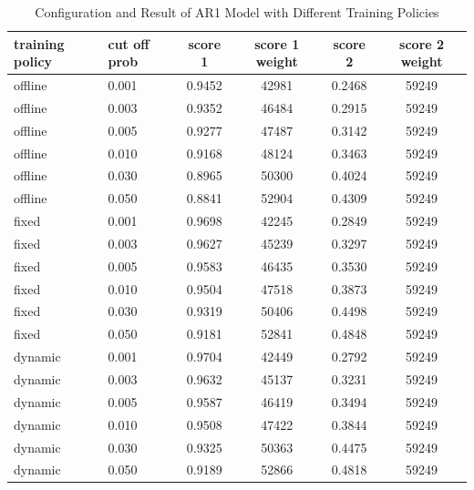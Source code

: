 \documentclass{article}
\begin{document}
\begin{table}[htbp]
  \begin{center}
    \caption{Configuration and Result of AR1 Model with Different Training Policies}
    \label{tab:tab1.5.1}
    \begin{tabular}{l|l|*{4}{c}} \textbf{training policy} & \textbf{cut off
      prob} & \textbf{score 1} & \textbf{score 1 weight} & \textbf{score 2} &
      \textbf{score 2 weight} \\
      \hline
      offline & 0.001 & 0.9452 & 42981 & 0.2468 & 59249\\
      offline & 0.003 & 0.9352 & 46484 & 0.2915 & 59249\\
      offline & 0.005 & 0.9277 & 47487 & 0.3142 & 59249\\
      offline & 0.010 & 0.9168 & 48124 & 0.3463 & 59249\\
      offline & 0.030 & 0.8965 & 50300 & 0.4024 & 59249\\
      offline & 0.050 & 0.8841 & 52904 & 0.4309 & 59249\\
      fixed & 0.001 & 0.9698 & 42245 & 0.2849 & 59249\\
      fixed & 0.003 & 0.9627 & 45239 & 0.3297 & 59249\\
      fixed & 0.005 & 0.9583 & 46435 & 0.3530 & 59249\\
      fixed & 0.010 & 0.9504 & 47518 & 0.3873 & 59249\\
      fixed & 0.030 & 0.9319 & 50406 & 0.4498 & 59249\\
      fixed & 0.050 & 0.9181 & 52841 & 0.4848 & 59249\\
      dynamic & 0.001 & 0.9704 & 42449 & 0.2792 & 59249\\
      dynamic & 0.003 & 0.9632 & 45137 & 0.3231 & 59249\\
      dynamic & 0.005 & 0.9587 & 46419 & 0.3494 & 59249\\
      dynamic & 0.010 & 0.9508 & 47422 & 0.3844 & 59249\\
      dynamic & 0.030 & 0.9325 & 50363 & 0.4475 & 59249\\
      dynamic & 0.050 & 0.9189 & 52866 & 0.4818 & 59249\\
    \end{tabular}
  \end{center}
\end{table}
\end{document}

